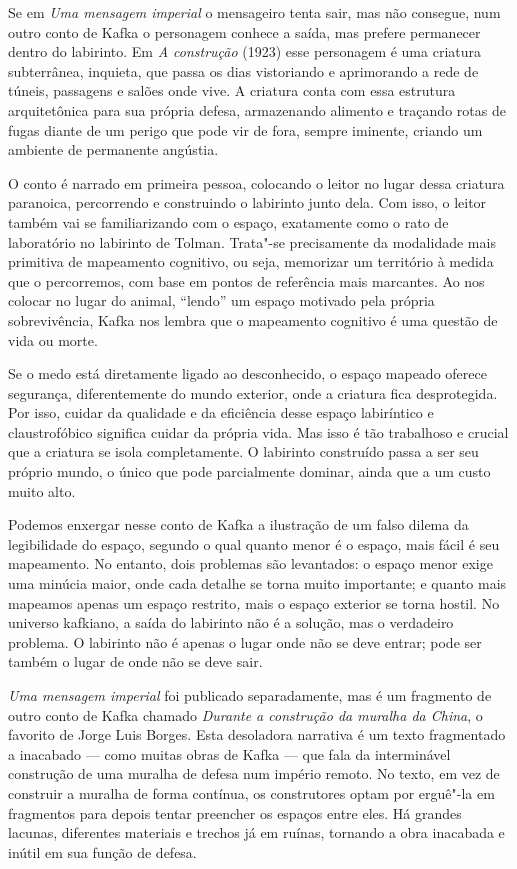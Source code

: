 Se em \emph{Uma mensagem imperial} o mensageiro tenta sair, mas não
consegue, num outro conto de Kafka o personagem conhece a saída, mas
prefere permanecer dentro do labirinto. Em \emph{A construção} (1923) \label{construcao}
esse personagem é uma criatura subterrânea, inquieta, que passa os dias
vistoriando e aprimorando a rede de túneis, passagens e salões onde
vive. A criatura conta com essa estrutura arquitetônica para sua própria
defesa, armazenando alimento e traçando rotas de fugas diante de um
perigo que pode vir de fora, sempre iminente, criando um ambiente de
permanente angústia.

O conto é narrado em primeira pessoa, colocando o leitor no lugar dessa
criatura paranoica, percorrendo e construindo o labirinto junto dela. Com
isso, o leitor também vai se familiarizando com o espaço, exatamente
como o rato de laboratório no labirinto de Tolman. Trata"-se precisamente
da modalidade mais primitiva de mapeamento cognitivo, ou seja, memorizar
um território à medida que o percorremos, com base em pontos de
referência mais marcantes. Ao nos colocar no lugar do animal, ``lendo''
um espaço motivado pela própria sobrevivência, Kafka nos lembra que o
mapeamento cognitivo é uma questão de vida ou morte.

Se o medo está diretamente ligado ao desconhecido, o espaço mapeado
oferece segurança, diferentemente do mundo exterior, onde a criatura
fica desprotegida. Por isso, cuidar da qualidade e da eficiência desse
espaço labiríntico e claustrofóbico significa cuidar da própria vida.
Mas isso é tão trabalhoso e crucial que a criatura se isola
completamente. O labirinto construído passa a ser seu próprio mundo, o
único que pode parcialmente dominar, ainda que a um custo muito alto.

Podemos enxergar nesse conto de Kafka a ilustração de um falso dilema da
legibilidade do espaço, segundo o qual quanto menor é o espaço, mais
fácil é seu mapeamento. No entanto, dois problemas são levantados: o
espaço menor exige uma minúcia maior, onde cada detalhe se torna muito
importante; e quanto mais mapeamos apenas um espaço restrito\emph{,}
mais o espaço exterior se torna hostil. No universo kafkiano, a saída do
labirinto não é a solução, mas o verdadeiro problema. O labirinto não é
apenas o lugar onde não se deve entrar; pode ser também o lugar de onde
não se deve sair.

\emph{Uma mensagem imperial} foi publicado separadamente, mas é um
fragmento de outro conto de Kafka chamado \emph{Durante a construção da
muralha da China}, o favorito de Jorge Luis Borges. Esta desoladora
narrativa é um texto fragmentado a inacabado --- como muitas obras de
Kafka --- que fala da interminável construção de uma muralha de defesa
num império remoto. No texto, em vez de construir a muralha de forma
contínua, os construtores optam por erguê"-la em fragmentos para depois
tentar preencher os espaços entre eles. Há grandes lacunas, diferentes
materiais e trechos já em ruínas, tornando a obra inacabada e inútil em
sua função de defesa.

